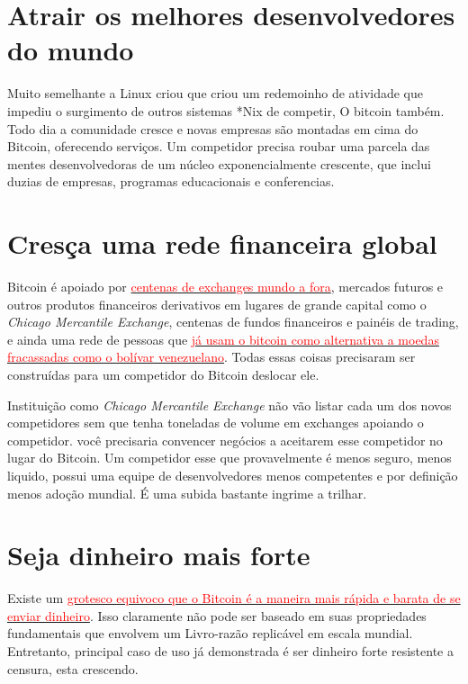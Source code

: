 \section*{Atrair os melhores desenvolvedores do mundo}

Muito semelhante a Linux criou que criou um redemoinho de atividade que impediu o surgimento de outros sistemas *Nix de competir, O bitcoin também. Todo dia a comunidade cresce e novas empresas são montadas em cima do Bitcoin, oferecendo serviços.
Um competidor precisa roubar uma parcela das mentes desenvolvedoras de um núcleo exponencialmente crescente, que inclui duzias de empresas, programas educacionais e conferencias.

\section*{Cresça uma rede financeira global}

Bitcoin é apoiado por \href{https://coinmarketcap.com/currencies/bitcoin/}{\textcolor{red}{centenas de exchanges mundo a fora}}, mercados futuros e outros produtos financeiros derivativos em lugares de grande capital como o \textit{Chicago Mercantile Exchange}, centenas de fundos financeiros e painéis de trading, e ainda uma rede de pessoas que \href{https://www.forbes.com/sites/realspin/2017/02/03/why-venezuelas-currency-crisis-is-a-case-study-for-bitcoin/#4671a1d719b2}{\textcolor{red}{já usam o bitcoin como alternativa a moedas fracassadas como o bolívar venezuelano}}. 
Todas essas coisas precisaram ser construídas para um competidor do Bitcoin deslocar ele.

Instituição como \textit{Chicago Mercantile Exchange} não vão listar cada um dos novos competidores sem que tenha toneladas de volume em exchanges apoiando o competidor. você precisaria convencer negócios a aceitarem esse competidor no lugar do Bitcoin. Um competidor esse que provavelmente é menos seguro, menos liquido, possui uma equipe de desenvolvedores menos competentes e por definição menos adoção mundial. 
É uma subida bastante ingrime a trilhar.

\section*{Seja dinheiro mais forte}

Existe um \href{https://fintechnologynews.com/neither-fast-nor-cheap-choosing-bitcoin-is-foolish-says-nanopay/}{\textcolor{red}{grotesco equivoco que o Bitcoin é a maneira mais rápida e barata de se enviar dinheiro}}. 
Isso claramente não pode ser baseado em suas propriedades fundamentais que envolvem um Livro-razão replicável em escala mundial. 
Entretanto, principal caso de uso já demonstrada é ser dinheiro forte resistente a censura, esta crescendo.

